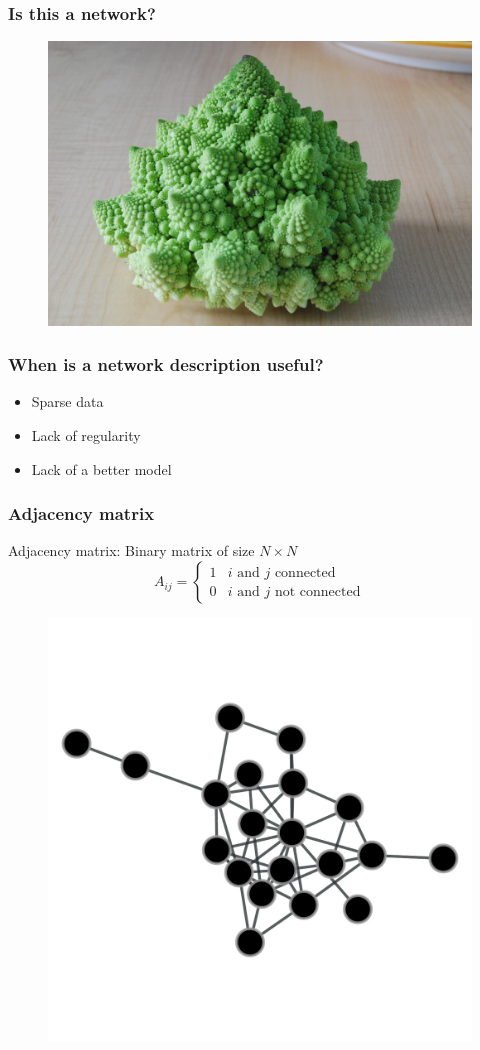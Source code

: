\documentclass{beamer}
\begin{document}
\begin{frame}
    \frametitle{Is this a network?}
\begin{figure}
    \begin{center}
        \includegraphics[width=0.7\columnwidth]{cauliflower.jpeg}
    \end{center}
\end{figure}
\end{frame}
\begin{frame}
    \frametitle{When is a network description useful?}
    \begin{itemize}
    \setlength\itemsep{1em}
        \item{Sparse data}
        \item{Lack of regularity}
        \item{Lack of a better model}
    \end{itemize}
\end{frame}
\begin{frame}
    \frametitle{Adjacency matrix}
\vspace{20pt}
\footnotesize
Adjacency matrix: Binary matrix of size $N \times N$
\begin{equation*}
A_{ij} = \begin{cases}
1 & \text{$i$ and $j$ connected}\\
0 & \text{$i$ and $j$ not connected}
\end{cases}
\end{equation*}
\vspace{10pt}

\begin{figure}
\includegraphics[width=0.5\columnwidth, trim = 0 0 0 100]{network.pdf}
\end{figure}
\end{frame}
\end{document}
